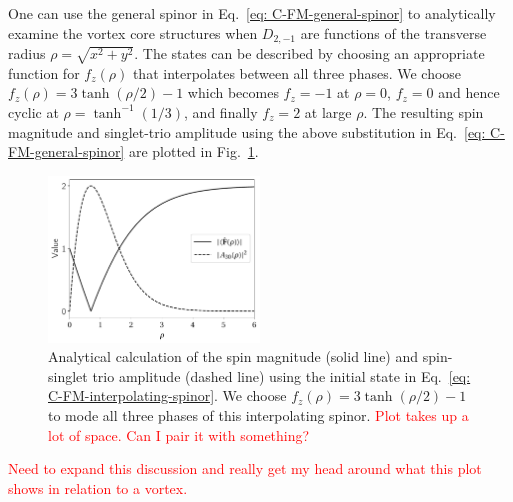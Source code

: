 One can use the general spinor in Eq.~\eqref{eq: C-FM-general-spinor} to
analytically examine the vortex core structures when \(D_{2,{-1}}\) are
functions of the transverse radius \(\rho = \sqrt{x^2 + y^2}\).
The states can be described by choosing an appropriate function for
\(f_z(\rho)\) that interpolates between all three phases.
We choose \(f_z(\rho) = 3\tanh(\rho/2) - 1\) which becomes \(f_z=-1\) at
\(\rho=0\), \(f_z=0\) and hence cyclic at \(\rho=\tanh^{-1}(1/3)\), and
finally \(f_z=2\) at large \(\rho \).
The resulting spin magnitude and singlet-trio amplitude using the above
substitution in Eq.~\eqref{eq: C-FM-general-spinor} are plotted in
Fig.~\ref{fig: C-FM-analytical-spin-singlet}.
\begin{figure}
    \centering
    \includegraphics[width=0.5\textwidth]
    {gfx/ch-spin2/spin_singlet_radius_analytical.pdf}
    \caption[Analytically calculated spin magnitude and spin-singlet trio
        amplitude for a cyclic to ferromagnetic interface]
    {\label{fig: C-FM-analytical-spin-singlet}
        Analytical calculation of the spin magnitude (solid line) and
        spin-singlet trio amplitude (dashed line) using the initial state in
        Eq.~\eqref{eq: C-FM-interpolating-spinor}.
        We choose \(f_z(\rho) = 3\tanh(\rho/2) - 1\) to mode all three phases of
        this interpolating spinor.
        \textcolor{red}{Plot takes up a lot of space. Can I pair it with
            something?}
    }
\end{figure}
\textcolor{red}{Need to expand this discussion and really get my head around
    what this plot shows in relation to a vortex.}

